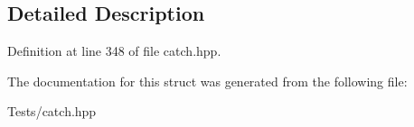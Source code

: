 \subsection{Detailed Description}


Definition at line 348 of file catch.\+hpp.



The documentation for this struct was generated from the following file\+:\begin{DoxyCompactItemize}
\item 
Tests/catch.\+hpp\end{DoxyCompactItemize}
